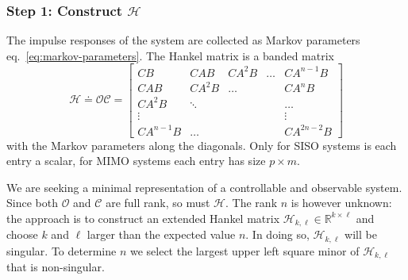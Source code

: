 \subsubsection{Step 1: Construct $\mathcal{H}$}
\label{sec:construct-Hankel}

The impulse responses of the system are collected as Markov parameters eq.~\eqref{eq:markov-parameters}. The Hankel matrix is a banded matrix
\begin{equation}
  \label{eq:hankel-matrix-definition}
  \mathcal{H} \doteq \mathcal{O}\mathcal{C} =
  \begin{bmatrix}
    CB & CAB & CA^2 B & \ldots & CA^{n-1}B \\
    CAB & CA^2B & \ldots & & CA^nB \\
    CA^2B & \ddots & & & \ldots \\
    \vdots & & & & \vdots \\
    CA^{n-1}B & \ldots & & & CA^{2n-2}B
  \end{bmatrix}
\end{equation}
with the Markov parameters along the diagonals. Only for SISO systems is each entry a scalar, for MIMO systems each entry has size $p\times m$.

We are seeking a minimal representation of a controllable and observable system. Since both $\mathcal{O}$ and $\mathcal{C}$ are full rank, so must $\mathcal{H}$. The rank $n$ is however unknown: the approach is to construct an extended Hankel matrix $\mathcal{H}_{k,\ell}\in \mathbb{R}^{k\times \ell}$ and choose $k$ and $\ell$ larger than the expected value $n$. In doing so, $\mathcal{H}_{k,\ell}$ will be singular. To determine $n$ we select the largest upper left square minor of $\mathcal{H}_{k,\ell}$ that is non-singular.

